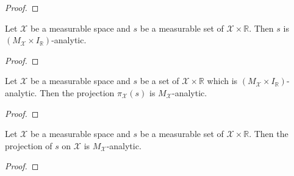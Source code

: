 \begin{proof}\leanok

\end{proof}


\begin{lemma}\label{lem:MeasurableSet.isPavingAnalytic_image2_prod}
  \leanok
Let $\mathcal{X}$ be a measurable space and $s$ be a measurable set of $\mathcal{X} \times \mathbb{R}$.
Then $s$ is $(M_{\mathcal{X}} \times I_{\mathbb{R}})$-analytic.
\end{lemma}

\begin{proof}\leanok

\end{proof}


\begin{lemma}\label{lem:isPavingAnalytic_fst_of_image2_prod_measurableSet_Icc}
  \leanok
Let $\mathcal{X}$ be a measurable space and $s$ be a set of $\mathcal{X} \times \mathbb{R}$ which is $(M_{\mathcal{X}} \times I_{\mathbb{R}})$-analytic.
Then the projection $\pi_{\mathcal{X}}(s)$ is $M_{\mathcal{X}}$-analytic.
\end{lemma}

\begin{proof}\leanok

\end{proof}


\begin{lemma}\label{lem:MeasurableSet.isPavingAnalytic_fst}
  \leanok
Let $\mathcal{X}$ be a measurable space and $s$ be a measurable set of $\mathcal{X} \times \mathbb{R}$.
Then the projection of $s$ on $\mathcal{X}$ is $M_{\mathcal{X}}$-analytic.
\end{lemma}

\begin{proof}\leanok

\end{proof}


